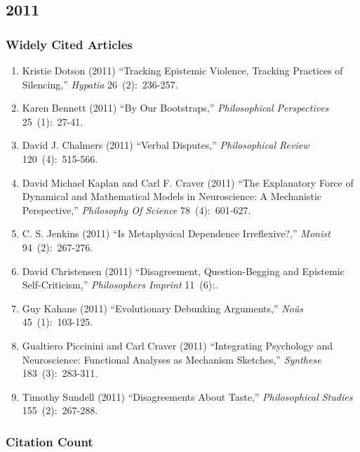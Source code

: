 \documentclass[
  10pt,
  letterpaper,
  DIV=11,
  numbers=noendperiod,
  twoside]{scrartcl}
\providecommand{\tightlist}{%
  \setlength{\itemsep}{0pt}\setlength{\parskip}{0pt}}\usepackage{longtable,booktabs,array}
\begin{document}
\newpage

\subsection{2011}\label{sec-s2011}

\subsubsection*{Widely Cited Articles}\label{widely-cited-articles-54}

\begin{enumerate}
\def\labelenumi{\arabic{enumi}.}
\tightlist
\item
  Kristie Dotson (2011) ``Tracking Epistemic Violence, Tracking
  Practices of Silencing,'' \emph{Hypatia} 26~(2):~236-257.
\item
  Karen Bennett (2011) ``By Our Bootstraps,'' \emph{Philosophical
  Perspectives} 25~(1):~27-41.
\item
  David J. Chalmers (2011) ``Verbal Disputes,'' \emph{Philosophical
  Review} 120~(4):~515-566.
\item
  David Michael Kaplan and Carl F. Craver (2011) ``The Explanatory Force
  of Dynamical and Mathematical Models in Neuroscience: A Mechanistic
  Perspective,'' \emph{Philosophy Of Science} 78~(4):~601-627.
\item
  C. S. Jenkins (2011) ``Is Metaphysical Dependence Irreflexive?,''
  \emph{Monist} 94~(2):~267-276.
\item
  David Christensen (2011) ``Disagreement, Question-Begging and
  Epistemic Self-Criticism,'' \emph{Philosophers Imprint} 11~(6):.
\item
  Guy Kahane (2011) ``Evolutionary Debunking Arguments,'' \emph{Noûs}
  45~(1):~103-125.
\item
  Gualtiero Piccinini and Carl Craver (2011) ``Integrating Psychology
  and Neuroscience: Functional Analyses as Mechanism Sketches,''
  \emph{Synthese} 183~(3):~283-311.
\item
  Timothy Sundell (2011) ``Disagreements About Taste,''
  \emph{Philosophical Studies} 155~(2):~267-288.
\end{enumerate}

\subsubsection*{Citation Count}\label{sec-count-2011}
\end{document}
